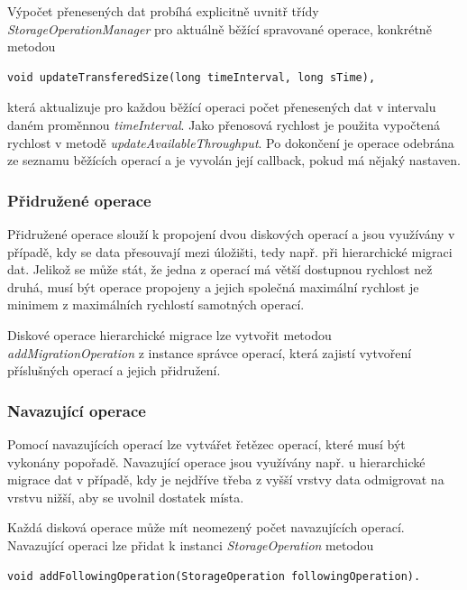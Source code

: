 \documentclass[czech,DP]{thesiskiv}
\begin{document}
Výpočet přenesených dat probíhá explicitně uvnitř třídy \textit{StorageOperationManager} pro aktuálně běžící spravované operace, konkrétně metodou

\begin{verbatim}
void updateTransferedSize(long timeInterval, long sTime),
\end{verbatim}

\noindent která aktualizuje pro každou běžící operaci počet přenesených dat v intervalu daném proměnnou \textit{timeInterval}. Jako přenosová rychlost je použita vypočtená rychlost v metodě \textit{updateAvailableThroughput}. Po  dokončení je operace odebrána ze seznamu běžících operací a je vyvolán její callback, pokud má nějaký nastaven.

\subsubsection*{Přidružené operace}

Přidružené operace slouží k propojení dvou diskových operací a jsou využívány v případě, kdy se data přesouvají mezi úložišti, tedy např. při hierarchické migraci dat. Jelikož se může stát, že jedna z operací má větší dostupnou rychlost než druhá, musí být operace propojeny a jejich společná maximální rychlost je minimem z maximálních rychlostí samotných operací. 

Diskové operace hierarchické migrace lze vytvořit metodou \textit{addMigrationOperation} z instance správce operací, která zajistí vytvoření příslušných operací a jejich přidružení.

\subsubsection*{Navazující operace}

Pomocí navazujících operací lze vytvářet řetězec operací, které musí být vykonány popořadě. Navazující operace jsou využívány např. u hierarchické migrace dat v případě, kdy je nejdříve třeba z vyšší vrstvy data odmigrovat na vrstvu nižší, aby se uvolnil dostatek místa. 

Každá disková operace může mít neomezený počet navazujících operací. Navazující operaci lze přidat k instanci \textit{StorageOperation} metodou

\begin{verbatim}
void addFollowingOperation(StorageOperation followingOperation).
\end{verbatim} 
\end{document}
